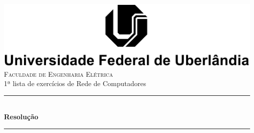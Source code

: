 \documentclass[11pt]{article}
\begin{document}
\begin{titlepage}

\newcommand{\HRule}{\rule{\linewidth}{0.5mm}} %

\center %


\includegraphics[scale=1.2]{ufulogo4}\\[1cm] %
 


\textsc{\Large Faculdade de Engenharia Elétrica}\\[0.6cm] %
{\large 1ª lista de exercícios de Rede de Computadores}\\[0.5cm] %


\HRule \\[0.4cm]
{ \huge \bfseries Resolução}\\[0.4cm] %
\HRule \\[1.5cm]
 


\end{titlepage}
\end{document}
